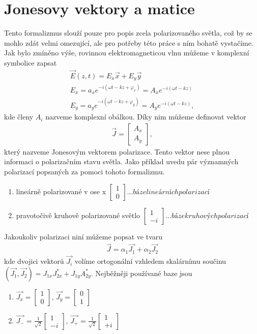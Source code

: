 \section{Jonesovy vektory a matice}
Tento formalizmus slouží pouze pro popis zcela polarizovaného světla, což by se mohlo zdát velmi omezující, ale pro potřeby této práce s ním bohatě vystačíme. Jak bylo zmíněno výše, rovinnou elektromagneticou vlnu můžeme v komplexní symbolice zapsat
\begin{eqnarray}
\vec{E}(z,t)=E_x\vec{x}+E_y\vec{y} \\
E_x=a_xe^{-i(\omega t-kz+\varphi_x)}=A_xe^{-i(\omega t-kz)}\\
E_y=a_ye^{-i(\omega t-kz+\varphi_y)}=A_ye^{-i(\omega t-kz)},
\end{eqnarray}
kde členy $A_i$ nazveme komplexní obálkou. Díky nim můžeme definovat vektor
\begin{eqnarray}
\vec{J}=\begin{bmatrix} A_x \\ A_y \end{bmatrix},
\end{eqnarray}
který nazveme Jonesovým vektorem polarizace. Tento vektor nese plnou informaci o polarizačním stavu světla. Jako příklad uvedu pár významných polarizací popsaných za pomoci tohoto formalizmu.
\begin{enumerate}
\item lineárně polarizované v ose x $\begin{bmatrix} 1 \\ 0 \end{bmatrix} \dots báze lineárních polarizací$
\item pravotočivě kruhově polarizované světlo $\begin{bmatrix} 1 \\ -i \end{bmatrix} \dots báze kruhových  polarizací$
\end{enumerate}
Jakoukoliv polarizaci niní můžeme popsat ve tvaru
\begin{eqnarray}
\vec{J}=\alpha_1\vec{J_1}+\alpha_2\vec{J_2}
\end{eqnarray}
kde dvojici vektorů $\vec{J_i}$ volíme ortogonální vzhledem skalárnímu součinu $(\vec{J_1},\vec{J_2})=J_{1x}J_{2x}^*+J_{1y}A_{2y}^*$. Nejběžněji používané  baze jsou
\begin{enumerate}
\item $\vec{J_x} = \begin{bmatrix} 1 \\ 0 \end{bmatrix}$, $\vec{J_y} = \begin{bmatrix} 0 \\ 1 \end{bmatrix}$
\item $\vec{J_-} =  \frac{1}{\sqrt{2}} \begin{bmatrix} 1 \\ -i \end{bmatrix}$, $\vec{J_+} = \frac{1}{\sqrt{2}} \begin{bmatrix} 1 \\ +i \end{bmatrix}$
\end{enumerate}
